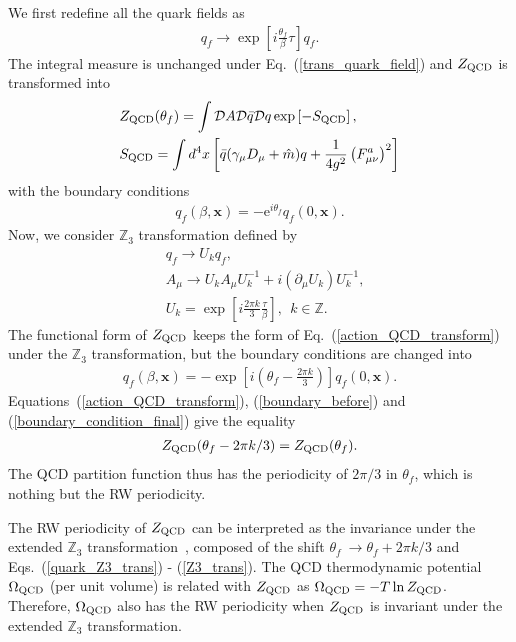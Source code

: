 \documentclass[prd,superscriptaddress,unsortedaddress,
twocolumn,showpacs,preprintnumbers,amsmath,amssymb]{revtex4}
\begin{document}
We first redefine all the quark fields as
\begin{eqnarray}
 q_{f}\rightarrow \exp\left[i\frac{\theta_{f}}{\beta}\tau\right]q_{f}.
  \label{trans_quark_field}
\end{eqnarray}
The integral measure is unchanged under Eq.~(\ref{trans_quark_field})
and $Z_{\rm QCD}$ is transformed into
 \begin{align}
  \begin{aligned}
 &Z_{\rm QCD}(\theta_{f})=\int\mathcal{D}A\mathcal{D}\bar{q}\mathcal{D}q
 \exp\left[-S_{\rm QCD}\right],
 \\
 & S_{\rm QCD}=\int d^4 x
 \left[
 \bar{q}(\gamma_{\mu}D_{\mu}+\hat{m})q
 +\frac{1}{4g^2}\left(F^{a}_{\mu\nu}\right)^2
  \right]
   \end{aligned}
 \label{action_QCD_transform}
 \end{align}
 with the boundary conditions
 \begin{eqnarray}
  q_{f}(\beta,\mathbf{x})=-\textrm{e}^{i\theta_{f}}q_{f}(0,\mathbf{x}).
   \label{boundary_before}
 \end{eqnarray}
Now, we consider $\mathbb{Z}_{3}$ transformation
defined by
\begin{align}
 & q_{f}\rightarrow U_{k}q_{f},
 \label{quark_Z3_trans}
 \\
 & A_{\mu}\rightarrow U_{k}A_{\mu}U^{-1}_{k}+i(\partial_{\mu}U_{k})U^{-1}_{k},
 \label{gluon_Z3_trans}
 \\
 & U_{k}=\exp\left[i\frac{2\pi k}{3}\frac{\tau}{\beta}\right],\ \ k\in\mathbb{Z}.
 \label{Z3_trans}
\end{align}
The functional form of $Z_{\rm QCD}$
keeps the form of Eq.~(\ref{action_QCD_transform})
under the $\mathbb{Z}_{3}$ transformation,
but the boundary conditions are changed into
\begin{eqnarray}
 q_{f}(\beta,\mathbf{x})=
  -\exp\left[i\left(\theta_{f}-\frac{2\pi k}{3}\right)\right]q_{f}(0,\mathbf{x}).
  \label{boundary_condition_final}
\end{eqnarray}
Equations~(\ref{action_QCD_transform}), (\ref{boundary_before})
and (\ref{boundary_condition_final})
give the equality
\begin{eqnarray}
 Z_{\rm QCD}(\theta_{f}-2\pi k/3)=Z_{\rm QCD}(\theta_{f}).
\end{eqnarray}
The QCD partition function thus has
the periodicity of $2\pi/3$ in $\theta_{f}$, which is nothing but the RW periodicity.

The RW periodicity of $Z_{\rm QCD}$ can be interpreted as
the invariance under the extended $\mathbb{Z}_{3}$
transformation~\cite{Sakai_PRD77_051901, Sakai_PRD78_036001,
Sakai_PRD78_076007, Sakai_PRD79_096001},
composed of the shift $\theta_{f}\ \rightarrow \theta_{f}+2\pi k/3$
and Eqs.~(\ref{quark_Z3_trans}) - (\ref{Z3_trans}).
The QCD thermodynamic potential $\Omega_{\rm QCD}$ (per unit volume) is
related with $Z_{\rm QCD}$ as $\Omega_{\rm QCD}=-T\ln Z_{\rm QCD}$.
Therefore, $\Omega_{\rm QCD}$ also has the RW periodicity
when $Z_{\rm QCD}$ is invariant under
the extended $\mathbb{Z}_{3}$ transformation.
\end{document}
